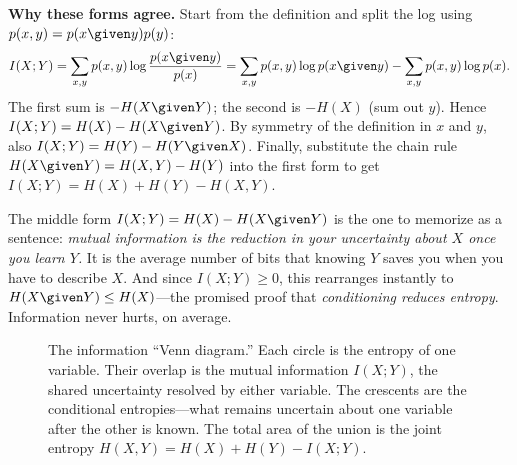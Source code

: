 \begin{whybox}
\textbf{Why these forms agree.} Start from the definition and split the log using $p(x,y) = p(x\given
y)p(y)$:
\[
  I(X;Y) = \sum_{x,y} p(x,y)\log\frac{p(x\given y)}{p(x)}
         = \sum_{x,y}p(x,y)\log p(x\given y) - \sum_{x,y}p(x,y)\log p(x).
\]
The first sum is $-H(X\given Y)$; the second is $-H(X)$ (sum out $y$). Hence $I(X;Y) = H(X) -
H(X\given Y)$. By symmetry of the definition in $x$ and $y$, also $I(X;Y) = H(Y) - H(Y\given X)$. Finally,
substitute the chain rule $H(X\given Y) = H(X,Y) - H(Y)$ into the first form to get $I(X;Y) = H(X) + H(Y)
- H(X,Y)$.
\end{whybox}

The middle form $I(X;Y) = H(X) - H(X\given Y)$ is the one to memorize as a sentence: \emph{mutual
information is the reduction in your uncertainty about $X$ once you learn $Y$.} It is the average number of
bits that knowing $Y$ saves you when you have to describe $X$. And since $I(X;Y) \ge 0$, this rearranges
instantly to $H(X\given Y) \le H(X)$---the promised proof that \emph{conditioning reduces entropy}.
Information never hurts, on average.

\begin{figure}[H]
\centering
{}
\caption{The information ``Venn diagram.'' Each circle is the entropy of one variable. Their overlap is
the mutual information $I(X;Y)$, the shared uncertainty resolved by either variable. The crescents are the
conditional entropies---what remains uncertain about one variable after the other is known. The total area
of the union is the joint entropy $H(X,Y) = H(X) + H(Y) - I(X;Y)$.}
\label{ch33:fig-venn}
\end{figure}

